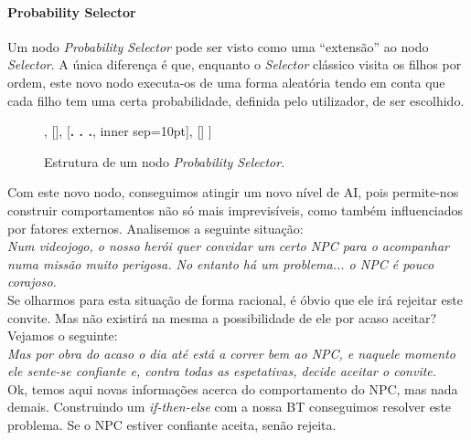 \paragraph{Probability Selector}{
    
    Um nodo \textit{Probability Selector} pode ser visto como uma ``extensão'' ao nodo \textit{Selector}. 
    A única diferença é que, enquanto o \textit{Selector} clássico visita os filhos por ordem, este novo nodo executa-os de uma forma aleatória tendo em conta que cada filho tem uma certa probabilidade, definida pelo utilizador, de ser escolhido.

    \begin{figure}[H]
    \centering
    \begin{behavior}
        [\probselector
            [\probnodeaction{$P_1$}{Child 1}],
            [],
            [{\textbf{. . .}}, inner sep=10pt],
            []
        ]
    \end{behavior}
    \caption{Estrutura de um nodo \textit{Probability Selector}.}
    \label{fig:2.6}
    \end{figure}

    Com este novo nodo, conseguimos atingir um novo nível de AI, pois permite-nos construir comportamentos não só mais imprevisíveis, como também influenciados por fatores externos.
    Analisemos a seguinte situação:
    \\

    \textit{
        Num videojogo, o nosso herói quer convidar um certo NPC para o acompanhar numa missão muito perigosa.
        No entanto há um problema... o NPC é pouco corajoso.
    }
    \\

    Se olharmos para esta situação de forma racional, é óbvio que ele irá rejeitar este convite.
    Mas não existirá na mesma a possibilidade de ele por acaso aceitar?
    Vejamos o seguinte:
    \\

    \textit{
        Mas por obra do acaso o dia até está a correr bem ao NPC, e naquele momento ele sente-se confiante e, contra todas as espetativas, decide aceitar o convite.
    }
    \\

    Ok, temos aqui novas informações acerca do comportamento do NPC, mas nada demais.
    Construindo um \textit{if-then-else} com a nossa BT conseguimos resolver este problema.
    Se o NPC estiver confiante aceita, senão rejeita.

}
